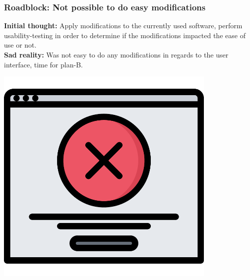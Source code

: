 \documentclass[xcolor=svgnames,10pt,aspectratio=1610]{beamer}
\begin{document}
\begin{frame}
  \frametitle{Roadblock: Not possible to do easy modifications}
  \begin{minipage}{.49\textwidth}
    \textbf{Initial thought:}
    Apply modifications to the currently used software, perform
    usability-testing in order to determine if the modifications impacted the
    ease of use or not. \\

    \textbf{Sad reality:}
    Was not easy to do any modifications in regards to the user interface, time
    for plan-B.
  \end{minipage}
  \begin{minipage}{.49\textwidth}
    \hspace{1.5cm}\includegraphics[width=0.8\textwidth]{img/error.pdf}
  \end{minipage}
\end{frame}
\end{document}
